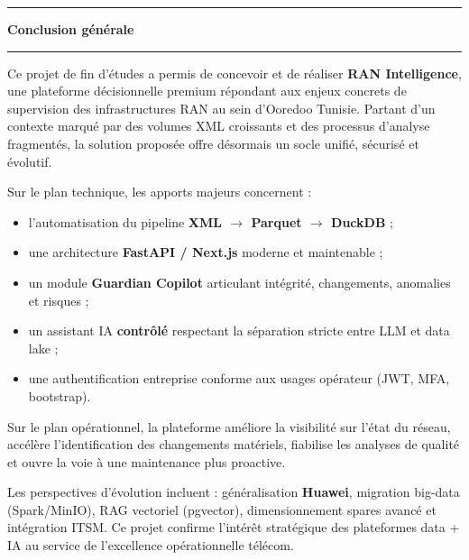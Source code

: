 \documentclass[12pt,a4paper]{report}
\begin{document}
\vspace*{1.2cm}
\noindent\hspace*{1.25cm}\begin{minipage}[c]{0.06\textwidth}\color{black}\rule{0.42cm}{1.25cm}\end{minipage}\hspace{-0.15cm}%
\begin{minipage}[c]{0.75\textwidth}{\LARGE\bfseries Conclusion générale}\\[-0.15cm]\rule{0.78\textwidth}{0.5pt}\end{minipage}
\vspace{1.35cm}

Ce projet de fin d'études a permis de concevoir et de réaliser \textbf{RAN Intelligence}, une plateforme décisionnelle premium répondant aux enjeux concrets de supervision des infrastructures RAN au sein d'Ooredoo Tunisie. Partant d'un contexte marqué par des volumes XML croissants et des processus d'analyse fragmentés, la solution proposée offre désormais un socle unifié, sécurisé et évolutif.

Sur le plan technique, les apports majeurs concernent :
\begin{itemize}[leftmargin=*,itemsep=2pt]
    \item l'automatisation du pipeline \textbf{XML $\rightarrow$ Parquet $\rightarrow$ DuckDB} ;
    \item une architecture \textbf{FastAPI / Next.js} moderne et maintenable ;
    \item un module \textbf{Guardian Copilot} articulant intégrité, changements, anomalies et risques ;
    \item un assistant IA \textbf{contrôlé} respectant la séparation stricte entre LLM et data lake ;
    \item une authentification entreprise conforme aux usages opérateur (JWT, MFA, bootstrap).
\end{itemize}

Sur le plan opérationnel, la plateforme améliore la visibilité sur l'état du réseau, accélère l'identification des changements matériels, fiabilise les analyses de qualité et ouvre la voie à une maintenance plus proactive.

Les perspectives d'évolution incluent : généralisation \textbf{Huawei}, migration big-data (Spark/MinIO), RAG vectoriel (pgvector), dimensionnement spares avancé et intégration ITSM. Ce projet confirme l'intérêt stratégique des plateformes data + IA au service de l'excellence opérationnelle télécom.
\end{document}
